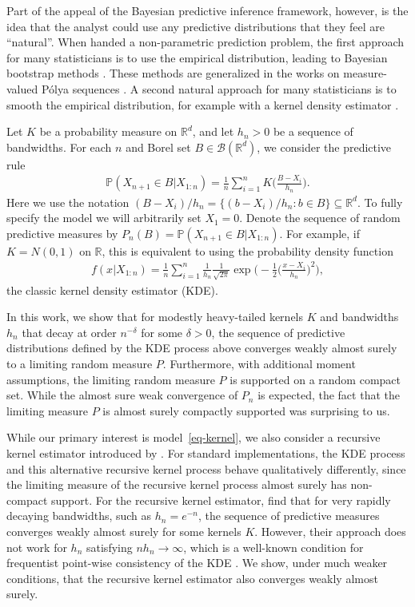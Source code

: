 \documentclass[12pt]{article}
\newcommand{\R}{\mathbb{R}}
\newcommand{\bP}{\mathbb{P}}
\begin{document}
Part of the appeal of the Bayesian predictive inference framework, however, is the idea that the analyst could use any predictive distributions that they feel are ``natural''.
When handed a non-parametric prediction problem, the first approach for many statisticians is to use the empirical distribution, leading to Bayesian bootstrap  methods \citep{ferguson1973bayesian, rubin1981bayesian, ghosh1997bayesian}. These methods are generalized in the works on measure-valued P\'olya sequences \citep{berti2023kernel, sariev2023infinite, chorbadzhiyska2025mvps}. A second natural approach for many statisticians is to smooth the empirical distribution, for example with a kernel density estimator \citep{silverman2018density}.

Let $K$ be a probability measure on $\R^d$, and let $h_n > 0$ be a sequence of bandwidths. For each $n$ and Borel set $B \in \mathcal{B}(\R^d)$, we consider the predictive rule
\begin{align}\label{eq-kernel}
    \bP(X_{n+1} \in B | X_{1:n}) = \frac{1}{n}\sum_{i = 1}^n K\bigg(\frac{B - X_i}{h_n}\bigg).
\end{align}
Here we use the notation $(B-X_i)/{h_n} = \{ (b - X_i) / h_n : b\in B\} \subseteq \R^d$.
To fully specify the model we will arbitrarily set $X_1 = 0$. Denote the sequence of random predictive measures by $P_n(B) = \bP(X_{n+1} \in B | X_{1:n})$.
For example, if $K = N(0, 1)$ on $\R$, this is equivalent to using the probability density function
\begin{align*}
    f(x | X_{1:n}) = \frac{1}{n} \sum_{i = 1}^n \frac{1}{h_n} \frac{1}{\sqrt{2\pi}} \exp \bigg(-\frac{1}{2}\bigg(\frac{x - X_i}{h_n}\bigg)^2\bigg),
\end{align*}
the classic kernel density estimator (KDE).

In this work, we show that for modestly heavy-tailed kernels $K$ and bandwidths $h_n$ that decay at order $n^{-\delta}$ for some $\delta > 0$, the sequence of predictive distributions defined by the KDE process above converges weakly almost surely to a limiting random measure $P$. Furthermore, with additional moment assumptions, the limiting random measure $P$ is supported on a random compact set. While the almost sure weak convergence of $P_n$ is expected, the fact that the limiting measure $P$ is almost surely compactly supported was surprising to us.

While our primary interest is model~\ref{eq-kernel}, we also consider a recursive kernel estimator introduced by \citet{wolverton1969asymptotically}.
For standard implementations, the KDE process and this alternative recursive kernel process behave qualitatively differently, since the limiting measure of the recursive kernel process almost surely has non-compact support. For the recursive kernel estimator, \citet{battiston2025bayesian} find that for very rapidly decaying bandwidths, such as $h_n = e^{-n}$, the sequence of predictive measures converges weakly almost surely for some kernels $K$. However, their approach does not work for $h_n$ satisfying $n h_n \to \infty$, which is a well-known condition for frequentist point-wise consistency of the KDE \citep{silverman2018density}. We show, under much weaker conditions, that the recursive kernel estimator also converges weakly almost surely.
\end{document}
